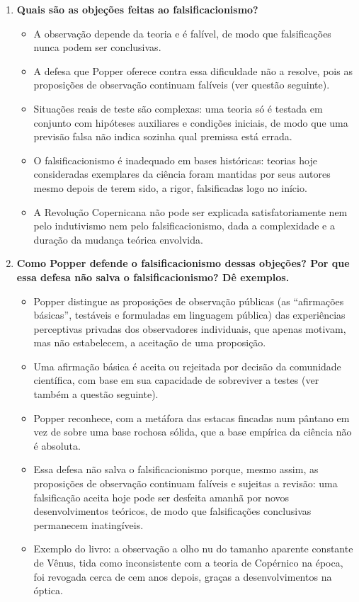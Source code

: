 \documentclass[10pt,a4paper]{extarticle}
\begin{document}
\begin{enumerate}[resume, label=\textbf{\arabic*.}, itemsep=10pt]
\item \textbf{Quais são as objeções feitas ao falsificacionismo?}
\begin{itemize}
  \item A observação depende da teoria e é falível, de modo que falsificações nunca podem ser conclusivas.
  \item A defesa que Popper oferece contra essa dificuldade não a resolve, pois as proposições de observação continuam falíveis (ver questão seguinte).
  \item Situações reais de teste são complexas: uma teoria só é testada em conjunto com hipóteses auxiliares e condições iniciais, de modo que uma previsão falsa não indica sozinha qual premissa está errada.
  \item O falsificacionismo é inadequado em bases históricas: teorias hoje consideradas exemplares da ciência foram mantidas por seus autores mesmo depois de terem sido, a rigor, falsificadas logo no início.
  \item A Revolução Copernicana não pode ser explicada satisfatoriamente nem pelo indutivismo nem pelo falsificacionismo, dada a complexidade e a duração da mudança teórica envolvida.
\end{itemize}

\item \textbf{Como Popper defende o falsificacionismo dessas objeções? Por que essa defesa não salva o falsificacionismo? Dê exemplos.}
\begin{itemize}
  \item Popper distingue as proposições de observação públicas (as \enquote{afirmações básicas}, testáveis e formuladas em linguagem pública) das experiências perceptivas privadas dos observadores individuais, que apenas motivam, mas não estabelecem, a aceitação de uma proposição.
  \item Uma afirmação básica é aceita ou rejeitada por decisão da comunidade científica, com base em sua capacidade de sobreviver a testes (ver também a questão seguinte).
  \item Popper reconhece, com a metáfora das estacas fincadas num pântano em vez de sobre uma base rochosa sólida, que a base empírica da ciência não é absoluta.
  \item Essa defesa não salva o falsificacionismo porque, mesmo assim, as proposições de observação continuam falíveis e sujeitas a revisão: uma falsificação aceita hoje pode ser desfeita amanhã por novos desenvolvimentos teóricos, de modo que falsificações conclusivas permanecem inatingíveis.
  \item Exemplo do livro: a observação a olho nu do tamanho aparente constante de Vênus, tida como inconsistente com a teoria de Copérnico na época, foi revogada cerca de cem anos depois, graças a desenvolvimentos na óptica.
\end{itemize}


\end{enumerate}
\end{document}
